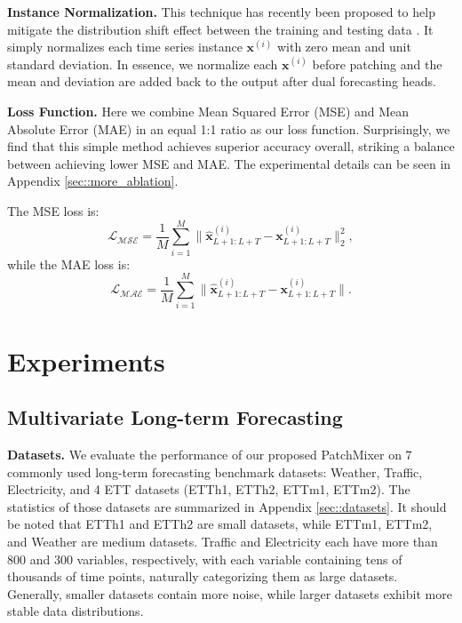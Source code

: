 \documentclass{article} \usepackage{iclr2024_conference,times}
\def\vx{{\bm{x}}}
\begin{document}
\textbf{Instance Normalization.} This technique has recently been proposed to help mitigate the distribution shift effect between the training and testing data \citep{instance,revin}. It simply normalizes each time series instance $\vx^{(i)}$ with zero mean and unit standard deviation. In essence, we normalize each $\vx^{(i)}$ before patching and the mean and deviation are added back to the output after dual forecasting heads.   



\textbf{Loss Function.} Here we combine Mean Squared Error (MSE) and Mean Absolute Error (MAE) in an equal 1:1 ratio as our loss function. Surprisingly, we find that this simple method achieves superior accuracy overall, striking a balance between achieving lower MSE and MAE. The experimental details can be seen in Appendix \ref{sec::more_ablation}. 

The MSE loss is: 
\begin{equation}
\mathcal{L_{MSE}} = \frac{1}{M}\sum_{i=1}^M \| \hat{\vx}^{(i)}_{L+1:L+T} - \vx^{(i)}_{L+1:L+T} \|_2^2,
\end{equation}
while the MAE loss is: 
\begin{equation}
\mathcal{L_{MAE}} = \frac{1}{M}\sum_{i=1}^M \| \hat{\vx}^{(i)}_{L+1:L+T} - \vx^{(i)}_{L+1:L+T} \|.
\end{equation}

\section{Experiments}
\subsection{Multivariate Long-term Forecasting}
\label{subsection::time series forecasting}



\textbf{Datasets.} We evaluate the performance of our proposed PatchMixer on $7$ commonly used long-term forecasting benchmark datasets: Weather, Traffic, Electricity, and 4 ETT datasets (ETTh1, ETTh2, ETTm1, ETTm2). The statistics of those datasets are summarized in Appendix \ref{sec::datasets}. It should be noted that ETTh1 and ETTh2 are small datasets, while ETTm1, ETTm2, and Weather are medium datasets. Traffic and Electricity each have more than 800 and 300 variables, respectively, with each variable containing tens of thousands of time points, naturally categorizing them as large datasets. Generally, smaller datasets contain more noise, while larger datasets exhibit more stable data distributions.
\end{document}
